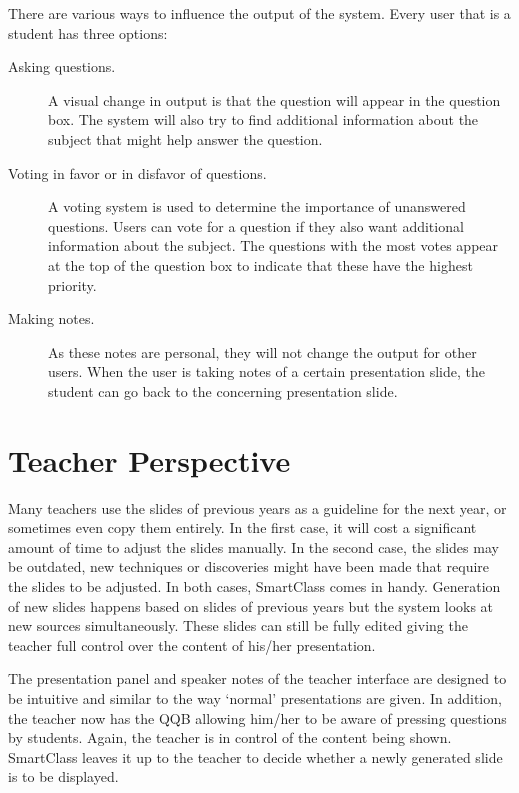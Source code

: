 \documentclass[11pt]{article}
\begin{document}
There are various ways to influence the output of the system. Every user that is a student has three options:
\begin{description}
\item[Asking questions.] A visual change in output is that the question will appear in the question box. The system will also try to find additional information about the subject that might help answer the question.
\item[Voting in favor or in disfavor of questions.] A voting system is used to determine the importance of unanswered questions. Users can vote for a question if they also want additional information about the subject. The questions with the most votes appear at the top of the question box to indicate that these have the highest priority.
\item[Making notes.] As these notes are personal, they will not change the output for other users. When the user is taking notes of a certain presentation slide, the student can go back to the concerning presentation slide.
\end{description}


\section{Teacher Perspective}
Many teachers use the slides of previous years as a guideline for the next year, or sometimes even copy them entirely. In the first case, it will cost a significant amount of time to adjust the slides manually. In the second case, the slides may be outdated, new techniques or discoveries might have been made that require the slides to be adjusted. In both cases, SmartClass comes in handy.  Generation of new slides happens based on slides of previous years but the system looks at new sources simultaneously. These slides can still be fully edited giving the teacher full control over the content of his/her presentation.

The presentation panel and speaker notes of the teacher interface are designed to be intuitive and similar to the way `normal' presentations are given. In addition, the teacher now has the QQB allowing him/her to be aware of pressing questions by students. Again, the teacher is in control of the content being shown. SmartClass leaves it up to the teacher to decide whether a newly generated slide is to be displayed. 
\end{document}

